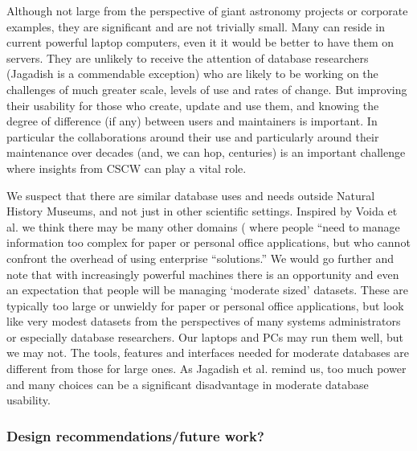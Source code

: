 Although not large from the perspective of giant astronomy projects or corporate examples, they are  significant and are not trivially small. Many can reside in current powerful laptop computers, even it it would be better to have them on servers. They are unlikely to receive the attention of database researchers (Jagadish is a commendable exception) who are likely to be working on the challenges of much greater scale, levels of use and rates of change. But improving their usability for those who create, update and use them, and knowing the degree of difference (if any) between users and maintainers is important. In particular the collaborations around their use and particularly around their maintenance over decades (and, we can hop, centuries) is an important challenge where insights from CSCW can play a vital role.

We suspect that there are similar database uses and needs outside Natural History Museums, and not just in other scientific settings. Inspired by Voida et al. we think there may be  many other domains ( where people “need to manage information too complex for paper or personal office applications, but who cannot confront the overhead of using enterprise “solutions.” We would go further and note that with increasingly powerful machines there is an opportunity and even an expectation that people will be managing ‘moderate sized’ datasets. These are typically too large or unwieldy for paper or personal office applications, but look like very modest datasets from the perspectives of many systems administrators or especially database researchers. Our laptops and PCs may run them well, but we may not. The tools, features and interfaces needed for moderate databases are different from those for large ones. As Jagadish et al. remind us, too much power and many choices can be a significant disadvantage in moderate database usability.

\subsubsection{Design recommendations/future work?}

